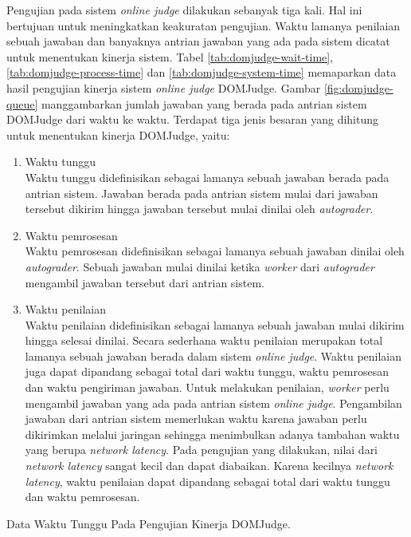 \par Pengujian pada sistem \textit{online judge} dilakukan sebanyak tiga kali. Hal ini bertujuan untuk meningkatkan keakuratan pengujian. Waktu lamanya penilaian sebuah jawaban dan banyaknya antrian jawaban yang ada pada sistem dicatat untuk menentukan kinerja sistem. Tabel \ref{tab:domjudge-wait-time}, \ref{tab:domjudge-process-time} dan \ref{tab:domjudge-system-time} memaparkan data hasil pengujian kinerja sistem \textit{online judge} DOMJudge. Gambar \ref{fig:domjudge-queue} manggambarkan jumlah jawaban yang berada pada antrian sistem DOMJudge dari waktu ke waktu. Terdapat tiga jenis besaran yang dihitung untuk menentukan kinerja DOMJudge, yaitu:
\begin{enumerate}
  \item Waktu tunggu \\ Waktu tunggu didefinisikan sebagai lamanya sebuah jawaban berada pada antrian sistem. Jawaban berada pada antrian sistem mulai dari jawaban tersebut dikirim hingga jawaban tersebut mulai dinilai oleh \textit{autograder}.
  \item Waktu pemrosesan \\ Waktu pemrosesan didefinisikan sebagai lamanya sebuah jawaban dinilai oleh \textit{autograder}. Sebuah jawaban mulai dinilai ketika \textit{worker} dari \textit{autograder} mengambil jawaban tersebut dari antrian sistem.
  \item Waktu penilaian \\ Waktu penilaian didefinisikan sebagai lamanya sebuah jawaban mulai dikirim hingga selesai dinilai. Secara sederhana waktu penilaian merupakan total lamanya sebuah jawaban berada dalam sistem \textit{online judge}. Waktu penilaian juga dapat dipandang sebagai total dari waktu tunggu, waktu pemrosesan dan waktu pengiriman jawaban. Untuk melakukan penilaian, \textit{worker} perlu mengambil jawaban yang ada pada antrian sistem \textit{online judge}. Pengambilan jawaban dari antrian sistem memerlukan waktu karena jawaban perlu dikirimkan melalui jaringan sehingga menimbulkan adanya tambahan waktu yang berupa \textit{network latency}. Pada pengujian yang dilakukan, nilai dari \textit{network latency} sangat kecil dan dapat diabaikan. Karena kecilnya \textit{network latency}, waktu penilaian dapat dipandang sebagai total dari waktu tunggu dan waktu pemrosesan.
\end{enumerate}

\begin{table}[ht]
    \centering
    
    \caption{Data Waktu Tunggu Pada Pengujian Kinerja DOMJudge.}
    \label{tab:domjudge-wait-time}
\end{table}

